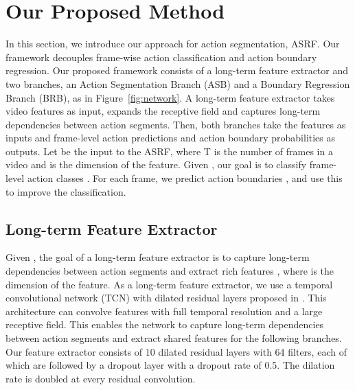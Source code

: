 \documentclass[10pt,twocolumn,letterpaper]{article}
\begin{document}
\section{Our Proposed Method}

In this section, we introduce our approach for action segmentation, ASRF.
Our framework decouples frame-wise action classification and action boundary regression.
Our proposed framework consists of a long-term feature extractor and two branches, an Action Segmentation Branch (ASB) and a Boundary Regression Branch (BRB), as in Figure~\ref{fig:network}.
A long-term feature extractor takes video features as input, expands the receptive field and captures long-term dependencies between action segments.
Then, both branches take the features as inputs and frame-level action predictions and action boundary probabilities as outputs. 
Let  be the input to the ASRF, where T is the number of frames in a video and  is the dimension of the feature. 
Given , our goal is to classify frame-level action classes .
For each frame, we predict action boundaries , and use this to improve the classification. 





\subsection{Long-term Feature Extractor}
\label{extractor}
Given , the goal of a long-term feature extractor is to capture long-term dependencies between action segments and extract rich features , where  is the dimension of the feature.
As a long-term feature extractor, we use a temporal convolutional network (TCN) with dilated residual layers proposed in \cite{mstcn}.
This architecture can convolve features with full temporal resolution and a large receptive field.
This enables the network to capture long-term dependencies between action segments and extract shared features for the following branches. 
Our feature extractor consists of 10 dilated residual layers with 64 filters, each of which are followed by a dropout layer with a dropout rate of 0.5.
The dilation rate is doubled at every residual convolution.
\end{document}

